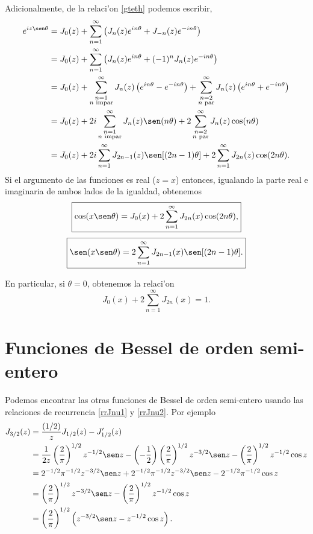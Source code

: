 Adicionalmente, de la relaci'on \eqref{gteth} podemos escribir,
\begin{align}
e^{iz\sen\theta} &= J_0(z)+\sum_{n=1}^\infty\left(J_n(z) e^{in\theta}+J_{-n}(z) e^{-in\theta}\right) \\
&=  J_0(z)+\sum_{n=1}^\infty\left(J_n(z) e^{in\theta}+(-1)^nJ_{n}(z) e^{-in\theta}\right) \\
&=  J_0(z)+\sum_{\substack{n=1 \\ n \text{ impar}}}^\infty J_n(z)\left(e^{in\theta}-e^{-in\theta}\right)+\sum_{\substack{n=2 \\ n \text{ par}}}^\infty J_n(z)\left(e^{in\theta}+e^{-in\theta}\right) \\
&=  J_0(z)+2i\sum_{\substack{n=1 \\ n \text{ impar}}}^\infty J_n(z)\sen(n\theta) +2\sum_{\substack{n=2 \\ n \text{ par}}}^\infty J_n(z)\cos(n\theta) \\
&=  J_0(z)+2i\sum_{n=1}^\infty J_{2n-1}(z)\sen[(2n-1)\theta] +2\sum_{n=1}^\infty J_{2n}(z)\cos(2n\theta).
\end{align}
Si el argumento de las funciones es real ($z=x$) entonces, igualando la parte real e imaginaria de ambos lados de la igualdad, obtenemos
\begin{equation}
\boxed{\cos(x\sen\theta)=J_0(x)+2\sum_{n=1}^\infty J_{2n}(x)\cos(2n\theta),}
\end{equation}
\begin{equation}
\boxed{\sen(x\sen\theta)=2\sum_{n=1}^\infty J_{2n-1}(x)\sen[(2n-1)\theta].}
\end{equation}

En particular, si $\theta=0$, obtenemos la relaci'on
\begin{equation}
J_0(x)+2\sum_{n=1}^\infty J_{2n}(x)=1.
\end{equation}

\section{Funciones de Bessel de orden semi-entero}


Podemos encontrar las otras funciones de Bessel de orden semi-entero usando las relaciones de recurrencia \eqref{rrJnu1} y \eqref{rrJnu2}. Por ejemplo
\begin{align}
    J_{3/2}(z)
    &= \frac{(1/2)}{z} J_{1/2}(z) - J_{1/2}'(z) 
    \\
    &= \frac{1}{2z} \left( \frac{2}{\pi} \right)^{1/2} z^{-1/2} \sen z
    - \left(-\frac{1}{2}\right) \left(\frac{2}{\pi}\right)^{1/2}
    z^{-3/2} \sen z - \left(\frac{2}{\pi}\right)^{1/2} z^{-1/2}
    \cos z 
    \\
    &= 2^{-1/2} \pi^{-1/2} z^{-3/2} \sen z
    + 2^{-1/2} \pi^{-1/2} z^{-3/2} \sen z
    - 2^{-1/2} \pi^{-1/2} \cos z 
    \\
    &= \left(\frac{2}{\pi}\right)^{1/2} z^{-3/2} \sen z
    - \left(\frac{2}{\pi}\right)^{1/2} z^{-1/2} \cos z 
    \\
    &= \left(\frac{2}{\pi}\right)^{1/2} \left( z^{-3/2} \sen z
      - z^{-1/2} \cos z \right).
  \end{align}



